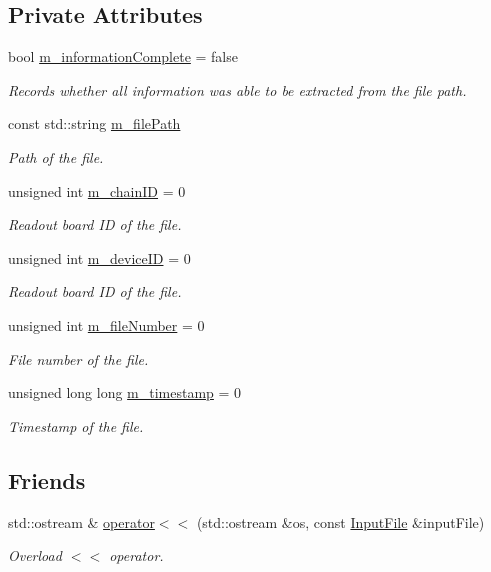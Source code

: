 \subsection*{Private Attributes}
\begin{DoxyCompactItemize}
\item 
bool \hyperlink{class_input_file_ab4724adf6c3da88760dccc42d6b6401d}{m\+\_\+information\+Complete} = false
\begin{DoxyCompactList}\small\item\em Records whether all information was able to be extracted from the file path. \end{DoxyCompactList}\item 
const std\+::string \hyperlink{class_input_file_ae3a763e9997cebb9f50aef29499d53c2}{m\+\_\+file\+Path}
\begin{DoxyCompactList}\small\item\em Path of the file. \end{DoxyCompactList}\item 
unsigned int \hyperlink{class_input_file_afba6d32b68bc6aff8d4b710ce2028418}{m\+\_\+chain\+ID} = 0
\begin{DoxyCompactList}\small\item\em Readout board ID of the file. \end{DoxyCompactList}\item 
unsigned int \hyperlink{class_input_file_aecf2f05fc5d9719c536f7dca6f3233a6}{m\+\_\+device\+ID} = 0
\begin{DoxyCompactList}\small\item\em Readout board ID of the file. \end{DoxyCompactList}\item 
unsigned int \hyperlink{class_input_file_af5c90eb7ded9297cc12248935968ee87}{m\+\_\+file\+Number} = 0
\begin{DoxyCompactList}\small\item\em File number of the file. \end{DoxyCompactList}\item 
unsigned long long \hyperlink{class_input_file_a900aea752727f969fa00a8b2727dd4e8}{m\+\_\+timestamp} = 0
\begin{DoxyCompactList}\small\item\em Timestamp of the file. \end{DoxyCompactList}\end{DoxyCompactItemize}
\subsection*{Friends}
\begin{DoxyCompactItemize}
\item 
std\+::ostream \& \hyperlink{class_input_file_aa20dd58dfa63d62aafd9c17c40285381}{operator$<$$<$} (std\+::ostream \&os, const \hyperlink{class_input_file}{Input\+File} \&input\+File)
\begin{DoxyCompactList}\small\item\em Overload $<$$<$ operator. \end{DoxyCompactList}\end{DoxyCompactItemize}


